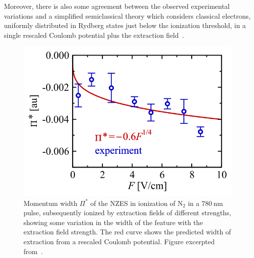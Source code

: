 Moreover, there is also some agreement between the observed experimental variations and a simplified semiclassical theory which considers classical electrons, uniformly distributed in Rydberg states just below the ionization threshold, in a single rescaled Coulomb potential plus the extraction field~\cite{Rost_latest}.


\begin{figure}[b]
  \centering
  \includegraphics[scale=1.15]{6-LES/Figures/figure6O.png}
  \caption[
  Measured momentum width of the NZES, compared with predictions from extraction-field theory, as observed by E. Diesen et al.
  ]{
  Momentum width $\Pi^*$ of the NZES in ionization of $\mathrm{N_2}$ in a $\SI{780}{\nano\meter}$ pulse, subsequently ionized by extraction fields of different strengths, showing some variation in the width of the feature with the extraction field strength. The red curve shows the predicted width of extraction from a rescaled Coulomb potential.
  Figure excerpted from~.
  }
\label{f6-diesen-scaling-original-figure}
\end{figure}

